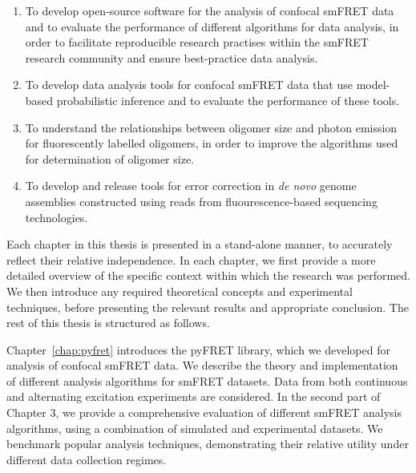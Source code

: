 \begin{enumerate}

\item To develop open-source software for the analysis of confocal smFRET data and to evaluate the performance of different algorithms for data analysis, in order to facilitate reproducible research practises within the smFRET research community and ensure best-practice data analysis.

\item To develop data analysis tools for confocal smFRET data that use model-based probabilistic inference and to evaluate the performance of these tools.

\item To understand the relationships between oligomer size and photon emission for fluorescently labelled oligomers, in order to improve the algorithms used for determination of oligomer size.

\item To develop and release tools for error correction in \emph{de novo} genome assemblies constructed using reads from fluourescence-based sequencing technologies.    

\end{enumerate}

Each chapter in this thesis is presented in a stand-alone manner, to accurately reflect their relative independence. In each chapter, we first provide a more detailed overview of the specific context within which the research was performed. We then introduce any required theoretical concepts and experimental techniques, before presenting the relevant results and appropriate conclusion. The rest of this thesis is structured as follows.

Chapter~\ref{chap:pyfret} introduces the pyFRET library, which we developed for analysis of confocal smFRET data. We describe the theory and implementation of different analysis algorithms for smFRET datasets. Data from both continuous and alternating excitation experiments are considered. In the second part of Chapter 3, we provide a comprehensive evaluation of different smFRET analysis algorithms, using a combination of simulated and experimental datasets. We benchmark popular analysis techniques, demonstrating their relative utility under different data collection regimes. 


